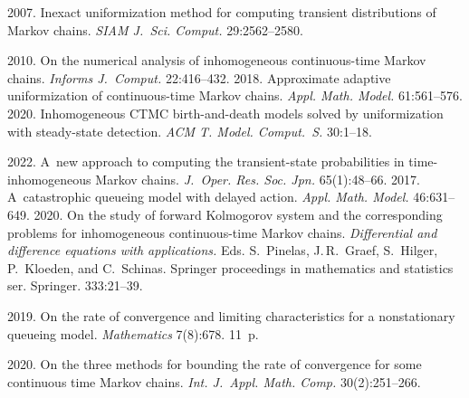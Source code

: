   \begin{multicols}{2}

\renewcommand{\bibname}{\protect\rmfamily References}

{\small\frenchspacing
 {%
 \begin{thebibliography}{99}
 
 2007. Inexact uniformization method for computing transient distributions of Markov chains. 
 \textit{SIAM J.~Sci. Comput.} 29:2562--2580.
 
 2010. On the numerical analysis of inhomogeneous continuous-time Markov chains. \textit{Informs J.~Comput.} 22:416--432.
 2018. Approximate adaptive uniformization of continuous-time Markov chains. \textit{Appl. Math. Model.} 61:561--576.
 2020. Inhomogeneous CTMC birth-and-death models solved by uniformization with steady-state detection.
 \textit{ACM T. Model. Comput.~S.} 30:1--18.

 2022. A~new approach to computing the transient-state probabilities in time-inhomogeneous Markov chains. 
\textit{J.~Oper. Res. Soc. Jpn.} 65(1):48--66.
 2017. A~catastrophic queueing model with delayed action. \textit{Appl. Math. Model.} 46:631--649.
 2020. On the study of forward Kolmogorov system and the corresponding problems for inhomogeneous continuous-time Markov chains.
\textit{Differential and difference equations with applications.}
 Eds. S.~Pinelas, J.\,R.~Graef, S.~Hilger, P.~Kloeden, and C.~Schinas. Springer proceedings in mathematics and statistics ser. Springer. 333:21--39. 

 2019. On the rate of convergence and limiting characteristics for a nonstationary queueing model.  \textit{Mathematics} 7(8):678. 11~p.
 
 2020. On the three methods for bounding the rate of convergence for some continuous time Markov chains. 
 \textit{Int. J.~Appl. Math. Comp.} 30(2):251--266.
 

\end{thebibliography}}}
\end{multicols}
